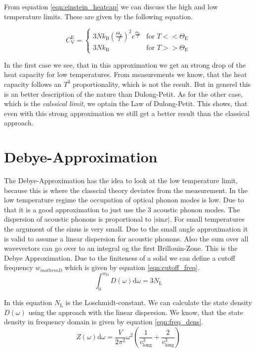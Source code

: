 From equation \ref{eqn:einstein_heatcap} we can discuss the high and low temperature limits. These are given by the following equation.

\begin{equation*}
    C_{\mathrm{V}}^{\mathrm{E}} =
    \begin{cases}
        3Nk_\mathrm{B}\left(\frac{\Theta_\mathrm{E}}{T}\right)^2 e^{\frac{\Theta_\mathrm{E}}{T}} & \text{for } T <<  \Theta_\mathrm{E} \\
        3Nk_\mathrm{B} & \text{for } T >>  \Theta_\mathrm{E}
    \end{cases}
\end{equation*}

In the first case we see, that in this approximation we get an strong drop of the heat capacity for low temperatures. From measurements we know, that the heat capacity follows an $T^3$ proportionality,
which is not the result. But in generel this is an better description of the nature than Dulong-Petit. As for the other case, which is the \textit{calssical limit}, we optain the 
Law of Dulong-Petit. This shows, that even with this strong approximation we still get a better result than the classical approach.

\section{Debye-Approximation}
\label{sec:debye}
The Debye-Approximation has the idea to look at the low temperature limit, because this is where the classcial theory deviates from the measurement. In the low temperature regime the 
occupation of optical phonon modes is low. Due to that it is a good approximation to just use the $3$ acoustic phonon modes. The dispersion of acoustic phonons is proportional to  
$\lvert\text{sin}x\rvert$. For small temperatures the argument of the sinus is very small. Due to the small angle approximation it is valid to assume a linear dispersion for acoustic
phonons. Also the sum over all wavevectors can go over to an integral og the first Brillouin-Zone. This is the Debye Approximation. Due to the finiteness of a solid we can define
a cutoff frequency $w_{mathrm{D}}$ which is given by equation \ref{eqn:cutoff_freq}.
\begin{equation}
    \label{eqn:cutoff_freq}
    \int_0^{w_{\mathrm{D}}}D(\omega)\mathrm{d}\omega = 3N_\mathrm{L}
\end{equation}

In this equation $N_\mathrm{L}$ is the Loschmidt-constant. We can calculate the state density $D(\omega)$ using the approach with the linear dispersion. We know, that the state 
density in frequency domain is given by equation \ref{eqn:freq_dens}.
\begin{equation}
    \label{eqn:freq_dens}
    Z(\omega)\mathrm{d}\omega = \frac{V}{2\pi^2}\omega^2\left(\frac{1}{v_{\text{long}}^3}+\frac{2}{v_{\text{long}}^3}\right)
\end{equation} 

